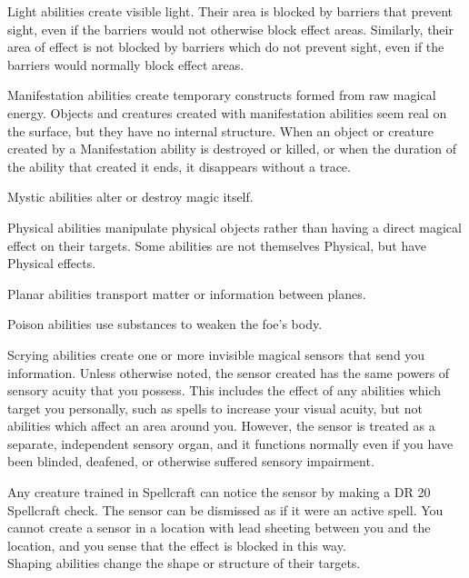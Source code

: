          Light abilities create visible light.
        Their area is blocked by barriers that prevent sight, even if the barriers would not otherwise block effect areas.
        Similarly, their area of effect is not blocked by barriers which do not prevent sight, even if the barriers would normally block effect areas.

         Manifestation abilities create temporary constructs formed from raw magical energy.
        Objects and creatures created with manifestation abilities seem real on the surface, but they have no internal structure.
        When an object or creature created by a Manifestation ability is destroyed or killed, or when the duration of the ability that created it ends, it disappears without a trace.

         Mystic abilities alter or destroy magic itself.

         Physical abilities manipulate physical objects rather than having a direct magical effect on their targets.
        Some abilities are not themselves Physical, but have Physical effects.

         Planar abilities transport matter or information between planes.

         Poison abilities use substances to weaken the foe's body.

         Scrying abilities create one or more invisible magical sensors that send you information.
        Unless otherwise noted, the sensor created has the same powers of sensory acuity that you possess.
        This includes the effect of any abilities which target you personally, such as spells to increase your visual acuity, but not abilities which affect an area around you.
        However, the sensor is treated as a separate, independent sensory organ, and it functions normally even if you have been blinded, deafened, or otherwise suffered sensory impairment.
        \par Any creature trained in Spellcraft can notice the sensor by making a DR 20 Spellcraft check.
        The sensor can be dismissed as if it were an active spell.
        You cannot create a sensor in a location with lead sheeting between you and the location, and you sense that the effect is blocked in this way.
        \\

         Shaping abilities change the shape or structure of their targets.

